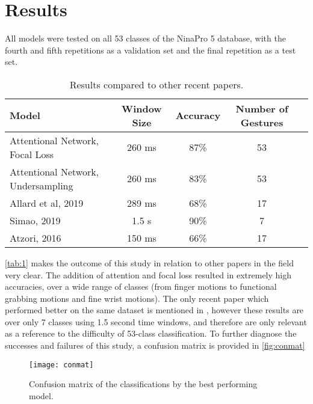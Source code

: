 \section{Results}

All models were tested on all 53 classes of the NinaPro 5 database, with the fourth and fifth repetitions as a validation set and the final repetition as a test set. 

\begin{table}[]
\caption{Results compared to other recent papers.}
\centering
\label{tab:1}
\begin{tabular*}{\textwidth}{@{\extracolsep{\fill}}lcccr@{}}
\toprule
Model                           & Window Size & Accuracy & Number of Gestures \\ \midrule
Attentional Network, Focal Loss & 260 ms      & 87\%     & 53                 \\
Attentional Network, Undersampling& 260 ms      & 83\%     & 53                 \\
Allard et al, 2019              & 289 ms      & 68\%     & 17                \\
Simao, 2019                     & 1.5 s       & 90\%     & 7                 \\ 
Atzori, 2016                    & 150 ms      & 66\%     & 17                 \\ \bottomrule
\end{tabular*}
\end{table}

\autoref{tab:1} makes the outcome of this study in relation to other papers in the field very clear. The addition of attention and focal loss resulted in extremely high accuracies, over a wide range of classes (from finger motions to functional grabbing motions and fine wrist motions). The only recent paper which performed better on the same dataset is mentioned in \cite{simao}, however these results are over only 7 classes using 1.5 second time windows, and therefore are only relevant as a reference to the difficulty of 53-class classification.  To further diagnose the successes and failures of this study, a confusion matrix is provided in \autoref{fig:conmat}



\begin{figure}[H]
\caption{%
Confusion matrix of the classifications by the best performing model.
}
\label{fig:conmat}
\begin{center}
\texttt{[image: conmat]}
\end{center}
\end{figure}

